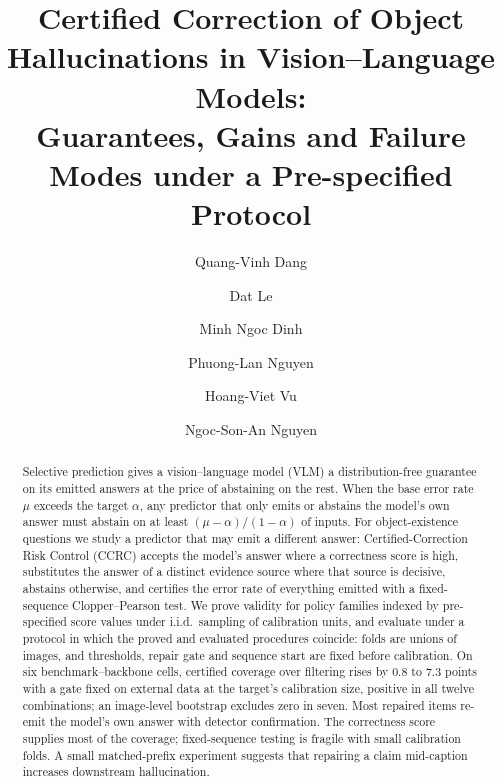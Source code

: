 \documentclass[review,number]{elsarticle}
\theoremstyle{plain}
\theoremstyle{definition}
\theoremstyle{remark}
\begin{document}
\begin{frontmatter}
\title{Certified Correction of Object Hallucinations in Vision--Language Models:\\
Guarantees, Gains and Failure Modes under a Pre-specified Protocol}

\author[bu]{Quang-Vinh Dang}
\author[uef]{Dat Le}
\author[mil]{Minh Ngoc Dinh}
\author[bu]{Phuong-Lan Nguyen}
\author[bu]{Hoang-Viet Vu}
\author[iuh]{Ngoc-Son-An Nguyen}
\address[bu]{British University Vietnam, Hung Yen, Vietnam}
\address[uef]{Department of Science, Technology, and International Projects, Ho Chi Minh City University of Economics and Finance, Ho Chi Minh City, 700000, Vietnam}
\address[mil]{Millennia Education, Ho Chi Minh City, Vietnam}
\address[iuh]{Industrial University of Ho Chi Minh City, Ho Chi Minh City, Vietnam}

\begin{abstract}
Selective prediction gives a vision--language model (VLM) a distribution-free guarantee on its emitted answers
at the price of abstaining on the rest. When the base error rate $\mu$ exceeds the target $\alpha$, any
predictor that only emits or abstains the model's own answer must abstain on at least $(\mu-\alpha)/(1-\alpha)$ of
inputs. For object-existence questions we study a predictor that may emit a different answer: Certified-Correction Risk Control (CCRC) accepts the
model's answer where a correctness score is high, substitutes the answer of a distinct evidence source where that source is decisive, abstains otherwise, and certifies the error rate of
everything emitted with a fixed-sequence Clopper--Pearson test. We prove validity for policy families indexed by
pre-specified score values under i.i.d.\ sampling of calibration units, and evaluate under a protocol in which the
proved and evaluated procedures coincide: folds are unions of images, and thresholds, repair gate and sequence start
are fixed before calibration. On six benchmark--backbone cells, certified coverage over filtering rises by $0.8$ to $7.3$
points with a gate fixed on external data at the target's calibration size, positive in all twelve combinations; an image-level bootstrap excludes zero in seven. Most repaired items re-emit the model's own answer with
detector confirmation. The correctness score supplies most of the coverage; fixed-sequence testing is fragile with small calibration folds. A small matched-prefix experiment suggests that repairing a claim mid-caption increases downstream
hallucination.
\end{abstract}


\end{frontmatter}
\end{document}
